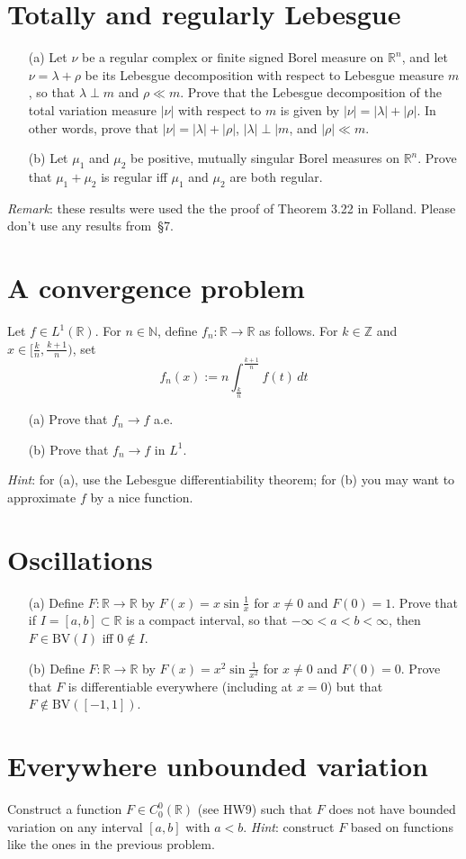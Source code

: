 \documentclass[lang=cn,11pt]{elegantbook}
\begin{document}
\section{Totally and regularly Lebesgue}
  \begin{itemize}
  \item[(a)]    Let $\nu$ be a regular complex or finite signed Borel measure on $\mathbb{R}^n$, and let
    $\nu=\lambda+\rho$ be its Lebesgue decomposition with respect to Lebesgue measure $m$, so that $\lambda\perp m$ and $\rho\ll m$. Prove that the Lebesgue decomposition of the total variation measure $|\nu|$ with respect to $m$ is given by
    $|\nu|=|\lambda|+|\rho|$. In other words, prove that $|\nu|=|\lambda|+|\rho|$, $|\lambda|\perp|m$, and $|\rho|\ll m$.
  \item[(b)]Let $\mu_1$ and $\mu_2$ be positive, mutually singular Borel measures on $\mathbb{R}^n$. Prove that $\mu_1+\mu_2$ is regular iff $\mu_1$ and $\mu_2$ are both regular.
  \end{itemize}
\textit{Remark}: these results were used the the proof of Theorem 3.22 in Folland. Please don't use any results from~\S7.

  \section{A convergence problem}
  Let $f\in L^1(\mathbb{R})$. For $n\in\mathbb{N}$, define $f_n\colon \mathbb{R} \to\mathbb{R}$ as follows. For $k\in\mathbb{Z}$ and $x\in[\frac{k}{n},\frac{k+1}{n})$, set \[
    f_n(x):=n\int_{\frac{k}{n}}^{\frac{k+1}{n}}f(t)\,dt
  \]
  \begin{itemize}
  \item[(a)]Prove that $f_n\to f$ a.e.
  \item[(b)]Prove that $f_n\to f$ in $L^1$.
  \end{itemize}
\textit{Hint}: for (a), use the Lebesgue differentiability theorem; for (b) you may want to approximate $f$ by a nice function.

\section{Oscillations}
  \begin{itemize}
  \item[(a)] Define $F\colon \mathbb{R} \to \mathbb{R}$ by $F(x)=x\sin\frac1{x}$ for $x\ne 0$ and $F(0)=1$. Prove that if $I=[a,b]\subset \mathbb{R}$ is a compact interval, so that $-\infty<a<b<\infty$, then $F\in\mathrm{BV}(I)$ iff $0\not\in I$.
  \item[(b)]Define $F\colon\mathbb{R} \to \mathbb{R}$ by $F(x)=x^2\sin\frac1{x^2}$ for $x\ne 0$ and $F(0)=0$. Prove that $F$ is differentiable everywhere (including at $x=0$) but that $F\not\in\mathrm{BV}([-1,1])$.
  \end{itemize}




\section{Everywhere unbounded variation}
  Construct a function $F\in C^0_0(\mathbb{R})$ (see HW9) such that $F$ does not have bounded variation on any interval $[a,b]$ with $a<b$.
  \textit{Hint}: construct $F$ based on functions like the ones in the previous problem.
\end{document}
